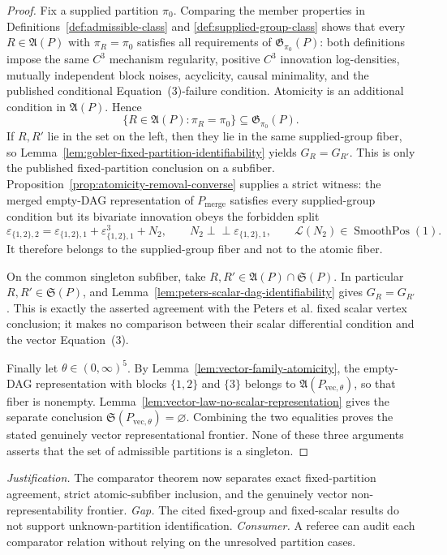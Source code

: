 \documentclass{article}
\begin{document}
\begin{proof}
Fix a supplied partition \(\pi_0\).  Comparing the member properties in
Definitions~\ref{def:admissible-class} and
\ref{def:supplied-group-class} shows that every
\(R\in\mathfrak A(P)\) with \(\pi_R=\pi_0\) satisfies all requirements of
\(\mathfrak G_{\pi_0}(P)\): both definitions impose the same \(C^3\)
mechanism regularity, positive \(C^3\) innovation log-densities, mutually
independent block noises, acyclicity, causal minimality, and the published
conditional Equation~(3)-failure condition.  Atomicity is an additional
condition in \(\mathfrak A(P)\).  Hence
\[
 \{R\in\mathfrak A(P):\pi_R=\pi_0\}
 \subseteq\mathfrak G_{\pi_0}(P).
\]
If \(R,R'\) lie in the set on the left, then they lie in the same supplied-group
fiber, so Lemma~\ref{lem:gobler-fixed-partition-identifiability} yields
\(G_R=G_{R'}\).  This is only the published fixed-partition conclusion on a
subfiber.  Proposition~\ref{prop:atomicity-removal-converse} supplies a strict
witness: the merged empty-DAG representation of \(P_{\mathrm{merge}}\)
satisfies every supplied-group condition but its bivariate innovation obeys
the forbidden split
\[
 \varepsilon_{\{1,2\},2}
 =\varepsilon_{\{1,2\},1}+\varepsilon_{\{1,2\},1}^{3}+N_2,
 \qquad
 N_2\perp\!\!\!\perp\varepsilon_{\{1,2\},1},
 \qquad
 \mathcal L(N_2)\in\operatorname{SmoothPos}(1).
\]
It therefore belongs to the supplied-group fiber and not to the atomic fiber.

On the common singleton subfiber, take
\(R,R'\in\mathfrak A(P)\cap\mathfrak S(P)\).  In particular
\(R,R'\in\mathfrak S(P)\), and
Lemma~\ref{lem:peters-scalar-dag-identifiability} gives \(G_R=G_{R'}\).
This is exactly the asserted agreement with the Peters et al. fixed scalar
vertex conclusion; it makes no comparison between their scalar differential
condition and the vector Equation~(3).

Finally let \(\theta\in(0,\infty)^5\).  By
Lemma~\ref{lem:vector-family-atomicity}, the empty-DAG representation with
blocks \(\{1,2\}\) and \(\{3\}\) belongs to
\(\mathfrak A(P_{\mathrm{vec},\theta})\), so that fiber is nonempty.
Lemma~\ref{lem:vector-law-no-scalar-representation} gives the separate
conclusion \(\mathfrak S(P_{\mathrm{vec},\theta})=\varnothing\).  Combining
the two equalities proves the stated genuinely vector representational
frontier.  None of these three arguments asserts that the set of admissible
partitions is a singleton.
\end{proof}
\par\smallskip\noindent \textit{Justification.} The comparator theorem now separates exact fixed-partition agreement, strict atomic-subfiber inclusion, and the genuinely vector non-representability frontier. \textit{Gap.} The cited fixed-group and fixed-scalar results do not support unknown-partition identification. \textit{Consumer.} A referee can audit each comparator relation without relying on the unresolved partition cases.
\end{document}
